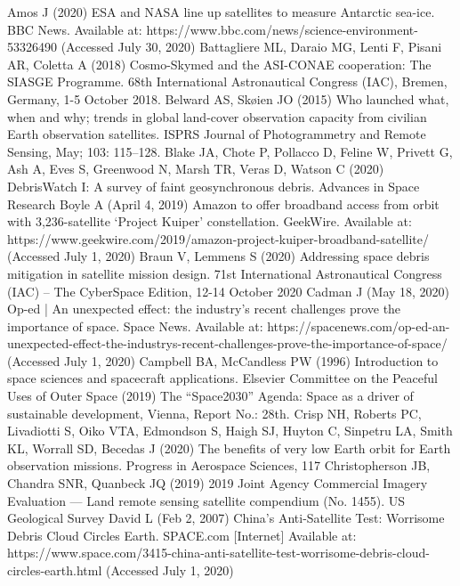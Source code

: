 \documentclass[12pt,a4paper,notitlepage,oneside,openright]{report}
\begin{document}
\begin{thebibliography}{100}
\bigskip

 Amos J (2020) ESA and NASA line up satellites to measure Antarctic sea-ice. BBC News. Available at: https://www.bbc.com/news/science-environment-53326490 (Accessed July 30, 2020)
 Battagliere ML, Daraio MG, Lenti F, Pisani AR, Coletta A (2018) Cosmo-Skymed and the ASI-CONAE cooperation: The SIASGE Programme. 68th International Astronautical Congress (IAC), Bremen, Germany, 1-5 October 2018.
 Belward AS, Skøien JO (2015) Who launched what, when and why; trends in global land-cover observation capacity from civilian Earth observation satellites. ISPRS Journal of Photogrammetry and Remote Sensing, May; 103: 115–128.
 Blake JA, Chote P, Pollacco D, Feline W, Privett G, Ash A, Eves S, Greenwood N, Marsh TR, Veras D, Watson C (2020) DebrisWatch I: A survey of faint geosynchronous debris. Advances in Space Research
 Boyle A (April 4, 2019) Amazon to offer broadband access from orbit with 3,236-satellite ‘Project Kuiper’ constellation. GeekWire. Available at: https://www.geekwire.com/2019/amazon-project-kuiper-broadband-satellite/ (Accessed July 1, 2020)
 Braun V, Lemmens S (2020) Addressing space debris mitigation in satellite mission design. 71st International Astronautical Congress (IAC) – The CyberSpace Edition, 12-14 October 2020
 Cadman J (May 18, 2020) Op-ed | An unexpected effect: the industry’s recent challenges prove the importance of space. Space News. Available at: https://spacenews.com/op-ed-an-unexpected-effect-the-industrys-recent-challenges-prove-the-importance-of-space/ (Accessed July 1, 2020)
 Campbell BA, McCandless PW (1996) Introduction to space sciences and spacecraft applications. Elsevier
 Committee on the Peaceful Uses of Outer Space (2019) The “Space2030” Agenda: Space as a driver of sustainable development, Vienna, Report No.: 28th.
 Crisp NH, Roberts PC, Livadiotti S, Oiko VTA, Edmondson S, Haigh SJ, Huyton C, Sinpetru LA, Smith KL, Worrall SD, Becedas J (2020) The benefits of very low Earth orbit for Earth observation missions. Progress in Aerospace Sciences, 117
 Christopherson JB, Chandra SNR, Quanbeck JQ (2019) 2019 Joint Agency Commercial Imagery Evaluation — Land remote sensing satellite compendium (No. 1455). US Geological Survey
 David L (Feb 2, 2007) China's Anti-Satellite Test: Worrisome Debris Cloud Circles Earth. SPACE.com [Internet] Available at: https://www.space.com/3415-china-anti-satellite-test-worrisome-debris-cloud-circles-earth.html (Accessed July 1, 2020)

\end{thebibliography}
\end{document}
